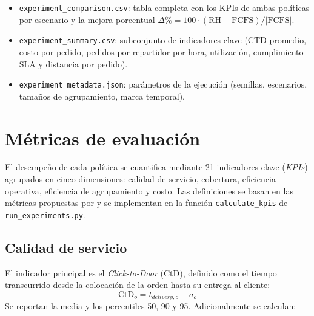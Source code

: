 \documentclass[12pt,letterpaper,oneside]{book}
\begin{document}
	\begin{itemize}
		\item \texttt{experiment\_comparison.csv}: tabla completa con los KPIs de ambas
		      políticas por escenario y la mejora porcentual
		      $\Delta\% = 100 \cdot (\text{RH} - \text{FCFS}) / |\text{FCFS}|$.
		\item \texttt{experiment\_summary.csv}: subconjunto de indicadores clave (CTD
		      promedio, costo por pedido, pedidos por repartidor por hora, utilización,
		      cumplimiento SLA y distancia por pedido).
		\item \texttt{experiment\_metadata.json}: parámetros de la ejecución (semillas,
		      escenarios, tamaños de agrupamiento, marca temporal).
	\end{itemize}

	\section{Métricas de evaluación}

	El desempeño de cada política se cuantifica mediante 21 indicadores clave
	(\textit{KPIs}) agrupados en cinco dimensiones: calidad de servicio, cobertura,
	eficiencia operativa, eficiencia de agrupamiento y costo.  Las definiciones
	se basan en las métricas propuestas por \citet{Reyes2018} y se implementan en
	la función \texttt{calculate\_kpis} de \texttt{run\_experiments.py}.

	\subsection{Calidad de servicio}

	El indicador principal es el \textit{Click-to-Door} (CtD), definido como el
	tiempo transcurrido desde la colocación de la orden hasta su entrega al cliente:
	\[
		\text{CtD}_o = t_{delivery,o} - a_o
	\]
	Se reportan la media y los percentiles 50, 90 y 95.  Adicionalmente se calculan:
\end{document}
